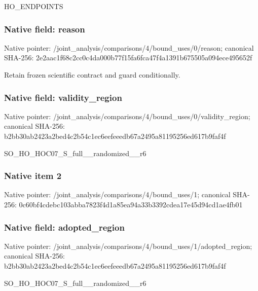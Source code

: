 \documentclass[10pt,a4paper]{article}
\begin{document}
\begingroup\raggedright\sloppy HO\_\allowbreak{}ENDPOINTS\par\endgroup

\subsubsection{Native field: reason}
Native pointer: /joint\_\allowbreak{}analysis/comparisons/4/bound\_\allowbreak{}uses/0/reason; canonical SHA-256: 2e2aac1f68c2cc0c4da000b77f15fa6fca47f4a1391b675505a094ece495652f

\begingroup\raggedright\sloppy Retain frozen scientific contract and guard conditionally.\par\endgroup

\subsubsection{Native field: validity\_\allowbreak{}region}
Native pointer: /joint\_\allowbreak{}analysis/comparisons/4/bound\_\allowbreak{}uses/0/validity\_\allowbreak{}region; canonical SHA-256: b2bb30ab2423a2bed4c2b54c1ec6eefeeedb67a2495a81195256ed617b9faf4f

\begingroup\raggedright\sloppy SO\_\allowbreak{}HO\_\allowbreak{}HOC07\_\allowbreak{}S\_\allowbreak{}full\_\allowbreak{}\_\allowbreak{}randomized\_\allowbreak{}\_\allowbreak{}r6\par\endgroup

\subsubsection{Native item 2}
Native pointer: /joint\_\allowbreak{}analysis/comparisons/4/bound\_\allowbreak{}uses/1; canonical SHA-256: 0c60bf4cdebc103abba7823f4d1a85ea94a33b3392cdea17e45d94cd1ae4fb01

\subsubsection{Native field: adopted\_\allowbreak{}region}
Native pointer: /joint\_\allowbreak{}analysis/comparisons/4/bound\_\allowbreak{}uses/1/adopted\_\allowbreak{}region; canonical SHA-256: b2bb30ab2423a2bed4c2b54c1ec6eefeeedb67a2495a81195256ed617b9faf4f

\begingroup\raggedright\sloppy SO\_\allowbreak{}HO\_\allowbreak{}HOC07\_\allowbreak{}S\_\allowbreak{}full\_\allowbreak{}\_\allowbreak{}randomized\_\allowbreak{}\_\allowbreak{}r6\par\endgroup
\end{document}
